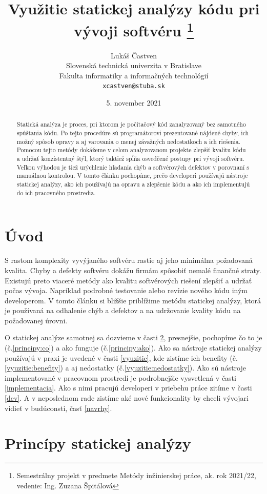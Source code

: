 \documentclass[10pt,twoside,slovak,a4paper]{article}
\title{Využitie statickej analýzy kódu pri vývoji softvéru
\thanks{Semestrálny projekt v predmete Metódy inžinierskej práce, ak. rok 2021/22, vedenie: Ing. Zuzana Špitálová}}
\author{Lukáš Častven\\[2pt]
	{\small Slovenská technická univerzita v Bratislave}\\
	{\small Fakulta informatiky a informačných technológií}\\
	{\small \texttt{xcastven@stuba.sk}}
	}
\date{\small  5. november 2021}
\begin{document}
\maketitle

\begin{abstract}
	Statická analýza je proces, pri ktorom je počítačový kód zanalyzovaný bez samotného spúšťania kódu.
	Po tejto procedúre sú programátorovi prezentované nájdené chyby, ich možný spôsob opravy a aj varovania
	o menej závažných nedostatkoch a ich riešenia. Pomocou tejto metódy dokážeme v celom analyzovanom projekte
	zlepšiť kvalitu kódu a udržať konzistentný štýl, ktorý taktiež spĺňa osvedčené postupy pri vývoji softvéru.
	Veľkou výhodou je tiež urýchlenie hľadania chýb a softvérových defektov v porovnaní s manuálnou kontrolou.
	V tomto článku pochopíme, prečo developeri používajú nástroje statickej analýzy, ako ich používajú
	na opravu a zlepšenie kódu a ako ich implementujú do ich pracovného prostredia.
\end{abstract}

\pagestyle{plain}

\section{Úvod}
S rastom komplexity vyvýjaného softvéru rastie aj jeho minimálna požadovaná kvalita. Chyby a defekty softvéru
dokážu firmám spôsobiť nemalé finančné straty. Existujú preto viaceré metódy ako kvalitu softvérových riešení zlepšiť
a udržať počas vývoja. Napríklad podrobné testovanie alebo revízie nového kódu iným developerom. V tomto článku si
bližšie priblížime metódu statickej analýzy, ktorá je používaná na odhalenie chýb a defektov a na udržovanie kvality
kódu na požadovanej úrovni.\cite{BrittanyJohnson,LisaNguyen}

O statickej analýze samotnej sa dozvieme v časti \ref{principy}, presnejšie, pochopíme čo to je (č.\ref{principy:co}) a
ako funguje (č.\ref{principy:ako}). Ako sa nástroje statickej analýzy používajú v praxi je uvedené v časti
\ref{vyuzitie}, kde zistíme ich benefity (č.\ref{vyuzitie:benefity}) a aj nedostatky (č.\ref{vyuzitie:nedostatky}).
Ako sú nástroje implementované v pracovnom prostredí je podrobnejšie vysvetlená v časti \ref{implementacia}. Ako s
nimi pracujú developeri v priebehu práce zitíme v časti \ref{dev}. A v neposlednom rade zistíme aké nové funkcionality
by chceli vývojari vidieť v budúconsti, časť \ref{navrhy}.


\section{Princípy statickej analýzy} \label{principy}
\end{document}
